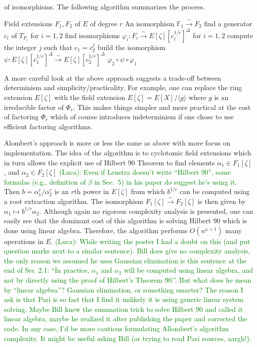 \documentclass[12pt]{article}
\theoremstyle{plain}
\theoremstyle{definition}
\newcommand{\ang}[1]{\langle#1\rangle}
\newcommand{\comment}[2][Note]{\textcolor{green}{(#1): #2}}
\def\F{\ensuremath{\mathbb{F}}}
\newcounter{algorithm}
\begin{document}
of isomorphisms. The following algorithm summarizes the process.
\begin{algorithm}[Lesntra]
	\begin{algorithmic}[1]
		\REQUIRE Field extensions $F_1, F_2$ of $E$ of degree $r$
		\ENSURE An isomorphism $\F_1 \xrightarrow{\sim} F_2$
		\STATE find a generator $c_i$ of $T_{F_i}$ for $i = 1, 2$
		\STATE find isomorphisms $\varphi_i: F_i \xrightarrow{\sim} E[\zeta][c_i^{1/r}]^\Delta$ for 
		$i = 1, 2$
		\STATE compute the integer $j$ such that $c_1 = c_2^j$
		\STATE build the isomorphism $\psi: E[\zeta][c_1^{1/r}]^\Delta \xrightarrow{\sim} 
		E[\zeta][c_2^{1/r}]^\Delta$
		\RETURN $\varphi_2 \circ \psi \circ \varphi_1$
	\end{algorithmic}
\end{algorithm}
A more careful look at the above approach suggests a trade-off between determinism and 
simplicity/practicality. For example, one can replace the ring extension $E[\zeta]$ with the field 
extension $E[\zeta] = E[X] / \ang{g}$ where $g$ is an irreducible factor of $\Phi_r$. This makes 
things simpler and more practical at the cost of factoring $\Phi_r$ which of course introduces 
indeterminism if one chose to use efficient factoring algorithms.

Alombert's approach is more or less the same as above with more focus on implementation. The idea 
of the algorithm is to cyclotomic field extensions which in turn allows the explicit use of Hilbert 
90 Theorem to find elements $\alpha_1 \in F_1[\zeta]$, and $\alpha_2 \in F_2[\zeta]$ \comment[Luca]{Even if Lenstra doesn't write ``Hilbert 90'', some formulas (e.g., definition of $\beta$ in Sec.~5) in his paper do suggest he's using it}. Then $b = 
\alpha_1^r / \alpha_2^r$ is an $r$th power in $E[\zeta]$ from which $b^{1/r}$ can be computed using 
a root extraction algorithm. The isomorphism $F_1[\zeta] \xrightarrow{\sim} F_2[\zeta]$ is then 
given by $\alpha_1 \mapsto b^{1/r}\alpha_2$. Although again no rigorous complexity analysis is 
presented, one can easily see that the dominant cost of this algorithm is solving Hilbert 90 which 
is done using linear algebra. Therefore, the algorithm performs $O(n^{\omega + 1})$ many operations 
in $E$. \comment[Luca]{While writing the poster I had a doubt on this (and put question marks next to a similar sentence). Bill does give no complexity analysis, the only reason we assumed he uses Gaussian elimination is this sentence at the end of Sec~2.1: ``In practice, $\alpha_1$ and $\alpha_2$ will be computed using linear algebra, and not by
directly using the proof of Hilbert's Theorem 90.''. But what does he mean by ``linear algebra''? Gaussian elimination, or something smarter? The reason I ask is that Pari is so fast that I find it unlikely it is using generic linear system solving. Maybe Bill knew the summation trick to solve Hilbert 90 and called it linear algebra, maybe he realized it after publishing the paper and corrected the code. In any case, I'd be more cautious formulating Allombert's algorithm complexity. It might be useful asking Bill (or trying to read Pari sources, aargh!).}
\end{document}
